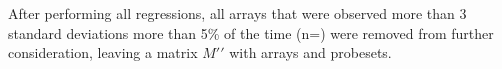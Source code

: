 \documentclass{article}
\begin{document}
After performing all  regressions, all arrays
that were observed more than 3 standard deviations more than 5\% of the time
(n=) were removed from further consideration, leaving a
matrix $M\prime\prime$ with  arrays and  probesets.


%
%
\end{document}
